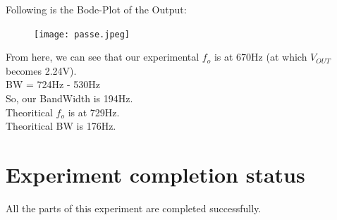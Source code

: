 \documentclass[12pt]{article}
\begin{document}
Following is the Bode-Plot of the Output:
\begin{figure}[H]
\begin{center}
\texttt{[image: passe.jpeg]}
\end{center}
\end{figure}

From here, we can see that our experimental $f_o$ is at 670Hz (at which $V_{OUT}$ becomes 2.24V). \\
BW = 724Hz - 530Hz\\
So, our BandWidth is 194Hz.\\
Theoritical $f_o$ is at 729Hz.\\
Theoritical BW is 176Hz.\\


\section{Experiment completion status}
All the parts of this experiment are completed successfully.

  
\end{document}

